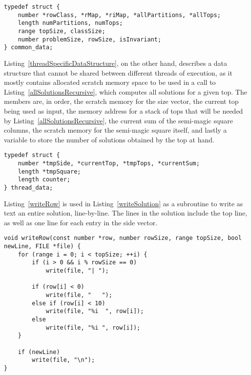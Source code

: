 \begin{lstlisting}[caption={Defining a data structure to hold thread-common data.},label={threadCommonDataStructure}]
typedef struct {
    number *rowClass, *rMap, *riMap, *allPartitions, *allTops;
    length numPartitions, numTops;
    range topSize, classSize;
    number problemSize, rowSize, isInvariant;
} common_data;
\end{lstlisting}

Listing~\ref{threadSpecificDataStructure}, on the other hand, describes a data structure that cannot be shared between different threads of execution, as it mostly contains allocated scratch memory space to be used in a call to Listing~\ref{allSolutionsRecursive}, which computes all solutions for a given top. The members are, in order, the scratch memory for the size vector, the current top being used as input, the memory address for a stack of tops that will be needed by Listing~\ref{allSolutionsRecursive}, the current sum of the semi-magic square columns, the scratch memory for the semi-magic square itself, and lastly a variable to store the number of solutions obtained by the top at hand.

\begin{lstlisting}[caption={Defining a data structure to hold thread-specific data.},label={threadSpecificDataStructure}]
typedef struct {
    number *tmpSide, *currentTop, *tmpTops, *currentSum;
    length *tmpSquare;
    length counter;
} thread_data;
\end{lstlisting}

\enlargethispage{\baselineskip}
Listing~\ref{writeRow} is used in Listing~\ref{writeSolution} as a subroutine to write as text an entire solution, line-by-line. The lines in the solution include the top line, as well as one line for each entry in the side vector.

\begin{lstlisting}[caption={Writing a single row from a combination matrix.},label={writeRow}]
void writeRow(const number *row, number rowSize, range topSize, bool newLine, FILE *file) {
    for (range i = 0; i < topSize; ++i) {
        if (i > 0 && i % rowSize == 0)
            write(file, "| ");

        if (row[i] < 0)
            write(file, "   ");
        else if (row[i] < 10)
            write(file, "%i  ", row[i]);
        else
            write(file, "%i ", row[i]);
    }

    if (newLine)
        write(file, "\n");
}
\end{lstlisting}

